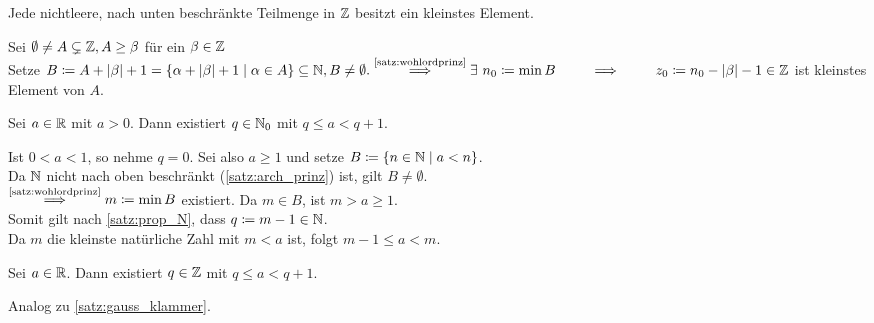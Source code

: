 \documentclass[../ana1.tex]{subfiles}
\begin{document}
\begin{kor}
	Jede nichtleere, nach unten beschränkte Teilmenge in \(\mathbb{Z} \) besitzt ein kleinstes Element.
\end{kor}
\begin{bew}
	Sei \(\emptyset \neq A \subsetneq \mathbb{Z} , A \geq \beta \) für ein \( \beta \in\mathbb{Z} \) \\
	Setze \(B \coloneqq A + \abs{\beta} + 1 = \set{\alpha + \abs{\beta} + 1 \; \vert \; \alpha \in A} \subseteq \N \ko B \neq \emptyset. \\
	\overset{\text{\autoref{satz:wohlordprinz}}}{\implies} \exists \, n_0 \coloneqq \min B\\
	\overset{\phantom{\text{\autoref{satz:wohlordprinz}}}}{\implies} z_0 \coloneqq n_0 - \abs{\beta} - 1 \in \Z \) ist kleinstes Element von \(A \).
\end{bew}

\begin{lem}\label{satz:gauss_klammer}
	Sei \( a \in\mathbb{R} \) mit \( a > 0 \). Dann existiert \(q \in \mathbb{N}_0 \) mit \(q \leq a < q + 1 \).
\end{lem}
\begin{bew}
	Ist \( 0 < a < 1 \), so nehme \( q = 0 \). Sei also \(a \geq 1 \) und setze \(B \coloneqq \{ n \in \mathbb{N} \; \vert \; a < n \} \). \\
	Da \( \mathbb{N} \) nicht nach oben beschränkt (\autoref{satz:arch_prinz}) ist, gilt \(B \neq \emptyset \). \\
	\(\overset{\text{\autoref{satz:wohlordprinz}}}{\implies} m \coloneqq \min B \) existiert. Da \(m \in B \), ist \(m > a \geq 1 \). \\
	Somit gilt nach \autoref{satz:prop_N}, dass \(q\coloneqq m-1\in\mathbb{N} \).\\
	Da \( m \) die kleinste natürliche Zahl mit \(m < a \) ist, folgt \(m - 1 \leq a < m \).
\end{bew}

\begin{bem}
	Sei \(a \in \mathbb{R} \). Dann existiert \(q \in \mathbb{Z} \) mit \(q \leq a < q + 1 \).
\end{bem}
\begin{bew}
	Analog zu \autoref{satz:gauss_klammer}.
\end{bew}
\end{document}
